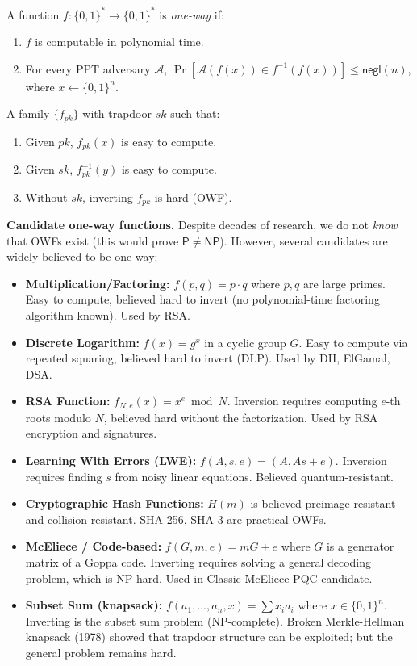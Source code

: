 \begin{definition}
A function $f: \{0,1\}^* \to \{0,1\}^*$ is \emph{one-way} if:
\begin{enumerate}
\item $f$ is computable in polynomial time.
\item For every PPT adversary $\mathcal{A}$, $\Pr[\mathcal{A}(f(x)) \in f^{-1}(f(x))] \le \mathsf{negl}(n)$, where $x \gets \{0,1\}^n$.
\end{enumerate}
\end{definition}

\begin{definition}
A family $\{f_{pk}\}$ with trapdoor $sk$ such that:
\begin{enumerate}
\item Given $pk$, $f_{pk}(x)$ is easy to compute.
\item Given $sk$, $f_{pk}^{-1}(y)$ is easy to compute.
\item Without $sk$, inverting $f_{pk}$ is hard (OWF).
\end{enumerate}
\end{definition}

\textbf{Candidate one-way functions.} Despite decades of research, we do not \emph{know} that OWFs exist (this would prove $\mathsf{P} \neq \mathsf{NP}$). However, several candidates are widely believed to be one-way:

\begin{itemize}
\item \textbf{Multiplication/Factoring:} $f(p,q) = p \cdot q$ where $p,q$ are large primes. Easy to compute, believed hard to invert (no polynomial-time factoring algorithm known). Used by RSA.
\item \textbf{Discrete Logarithm:} $f(x) = g^x$ in a cyclic group $G$. Easy to compute via repeated squaring, believed hard to invert (DLP). Used by DH, ElGamal, DSA.
\item \textbf{RSA Function:} $f_{N,e}(x) = x^e \bmod N$. Inversion requires computing $e$-th roots modulo $N$, believed hard without the factorization. Used by RSA encryption and signatures.
\item \textbf{Learning With Errors (LWE):} $f(A, s, e) = (A, As + e)$. Inversion requires finding $s$ from noisy linear equations. Believed quantum-resistant.
\item \textbf{Cryptographic Hash Functions:} $H(m)$ is believed preimage-resistant and collision-resistant. SHA-256, SHA-3 are practical OWFs.
\item \textbf{McEliece / Code-based:} $f(G, m, e) = mG + e$ where $G$ is a generator matrix of a Goppa code. Inverting requires solving a general decoding problem, which is NP-hard. Used in Classic McEliece PQC candidate.
\item \textbf{Subset Sum (knapsack):} $f(a_1,\dots,a_n, x) = \sum x_i a_i$ where $x \in \{0,1\}^n$. Inverting is the subset sum problem (NP-complete). Broken Merkle-Hellman knapsack (1978) showed that trapdoor structure can be exploited; but the general problem remains hard.
\end{itemize}

